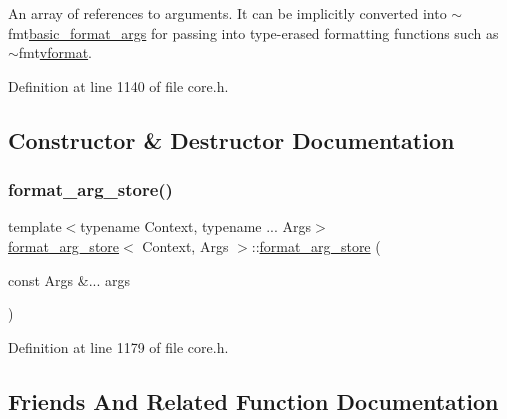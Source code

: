An array of references to arguments. It can be implicitly converted into {\ttfamily $\sim$fmt\hyperlink{classbasic__format__args}{basic\+\_\+format\+\_\+args}} for passing into type-\/erased formatting functions such as {\ttfamily $\sim$fmt\hyperlink{locale_8h_a1348d1312264bd011c54db919e0602b7}{vformat}}.  

Definition at line 1140 of file core.\+h.



\subsection{Constructor \& Destructor Documentation}
\mbox{\label{classformat__arg__store_a785430d11d4e8e5dcd9f231e7d69695e}} 
\subsubsection{\texorpdfstring{format\+\_\+arg\+\_\+store()}{format\_arg\_store()}}
{\footnotesize\ttfamily template$<$typename Context, typename ... Args$>$ \\
\hyperlink{classformat__arg__store}{format\+\_\+arg\+\_\+store}$<$ Context, Args $>$\+::\hyperlink{classformat__arg__store}{format\+\_\+arg\+\_\+store} (\begin{DoxyParamCaption}\item[{const Args \&...}]{args }\end{DoxyParamCaption})\hspace{0.3cm}{\ttfamily [inline]}}



Definition at line 1179 of file core.\+h.



\subsection{Friends And Related Function Documentation}
\mbox{\label{classformat__arg__store_ab8e9e33cc7b78829001a86ef6110ebb6}} 
